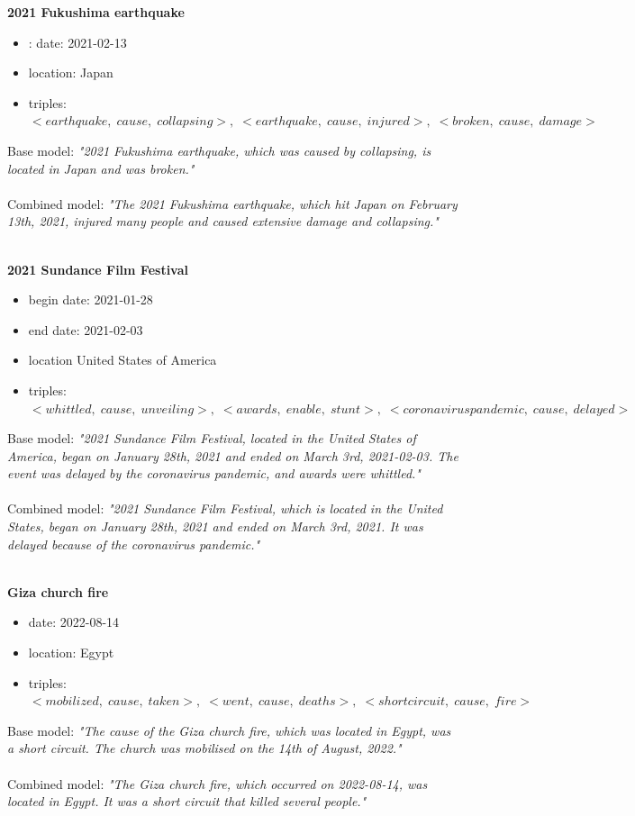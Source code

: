 \documentclass[
hf, %
]{ceurart}
\begin{document}
\textbf{2021 Fukushima earthquake}
\begin{itemize}
	\item: date: 2021-02-13
	\item location: Japan
	\item triples: $<earthquake,\;cause,\;collapsing>,\; <earthquake,\; cause,\; injured>,\; <broken,\; cause,\; damage>$
\end{itemize}
Base model: \textit{"2021 Fukushima earthquake, which was caused by collapsing, is located in Japan and was broken."}\\\\
\noindent
Combined model: \textit{"The 2021 Fukushima earthquake, which hit Japan on February 13th, 2021, injured many people and caused extensive damage and collapsing."}\\\\
\noindent

\textbf{2021 Sundance Film Festival}
\begin{itemize}
	\item begin date: 2021-01-28
	\item end date: 2021-02-03
	\item location United States of America
	\item triples: $<whittled,\;cause,\;unveiling>,\; <awards,\; enable,\; stunt>,\; <coronavirus pandemic,\; cause,\; delayed>$
\end{itemize}
Base model: \textit{"2021 Sundance Film Festival, located in the United States of America, began on January 28th, 2021 and ended on March 3rd, 2021-02-03. The event was delayed by the coronavirus pandemic, and awards were whittled."}\\\\
\noindent
Combined model: \textit{"2021 Sundance Film Festival, which is located in the United States, began on January 28th, 2021 and ended on March 3rd, 2021. It was delayed because of the coronavirus pandemic."}\\\\
\noindent

\textbf{Giza church fire}
\begin{itemize}
	\item date: 2022-08-14
	\item location: Egypt
	\item triples: $<mobilized,\;cause,\;taken>,\; <went,\; cause,\; deaths>,\; <short circuit,\; cause,\; fire>$
\end{itemize}
Base model: \textit{"The cause of the Giza church fire, which was located in Egypt, was a short circuit. The church was mobilised on the 14th of August, 2022."}\\\\
\noindent
Combined model: \textit{"The Giza church fire, which occurred on 2022-08-14, was located in Egypt. It was a short circuit that killed several people."}\\\\
\noindent
\end{document}
